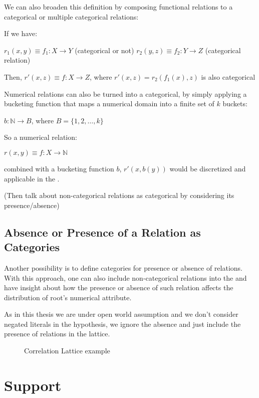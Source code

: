We can also broaden this definition by composing functional relations to a categorical or multiple categorical relations:

If we have:

$r_1(x,y) \equiv f_1 : X \rightarrow Y$ (categorical or not) \newline
$r_2(y,z) \equiv f_2 : Y \rightarrow Z$ (categorical relation)

Then, $r'(x,z) \equiv f : X \rightarrow Z$, where $r'(x,z)=r_2(f_1(x),z)$ is also categorical


Numerical relations can also be turned into a categorical, by simply applying a bucketing function that maps a numerical domain into a finite set of $k$ buckets:

$b: \mathbb{N} \rightarrow B$, where $B=\{1,2,\dots ,k \}$

So a numerical relation:

$r(x,y) \equiv f : X \rightarrow \mathbb{N}$ 

combined with a bucketing function $b$, $r'(x,b(y))$ would be discretized and applicable in the \graphname.

(Then talk about non-categorical relations as categorical by considering its presence/absence)

\subsection{Absence or Presence of a Relation as Categories}

Another possibility is to define categories for presence or absence of relations. With this approach, one can also include non-categorical relations into the \graphname and have insight about how the presence or absence of such relation affects the distribution of root's numerical attribute.

As in this thesis we are under open world assumption and we don't consider negated literals in the hypothesis, we ignore the absence and just include the presence of relations in the lattice.

\begin{figure}[!h]
  \caption{Correlation Lattice example}
  \centering
  
  \label{fig:presence}
\end{figure}

\section{Support}

